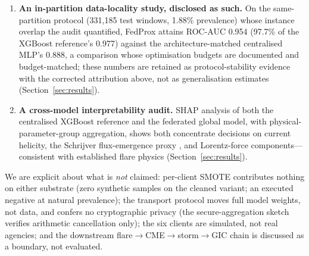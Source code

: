 \begin{enumerate}[leftmargin=2em, itemsep=3pt]
  the contribution here is the composite failure-mode dissection on
  this pipeline and the self-correction of our own earlier artefact.
  The shipped implementation transports
  model parameters only, so BatchNorm running statistics remain at
  initialisation on the server for the entire run; under that
  evaluation the FedAvg global model drifts from 0.950 to 0.098 test
  ROC-AUC over 50 rounds, and a saturated validation monitor ($F_1
  = 2p/(1{+}p)$ whenever every prediction is positive) restores the
  collapsed round-20 checkpoint as the ``best'' model. The same
  weights score 0.951 under correct normalisation and 0.953 even at
  round 50; with BatchNorm layers removed, both FedAvg and FedProx
  train stably to near-identical test quality, so the published
  algorithm gap is substantially an evaluation-implementation
  artefact (Sections~\ref{sec:res-bn}--\ref{sec:res-nobn}).
  \item \textbf{An in-partition data-locality study, disclosed as
  such.} On the same-partition protocol (331{,}185 test windows,
  1.88\% prevalence) whose instance overlap the audit quantified,
  FedProx attains ROC-AUC 0.954 (97.7\% of the XGBoost reference's
  0.977) against the architecture-matched centralised MLP's 0.888, a
  comparison whose optimisation budgets are documented and
  budget-matched; these numbers are retained as protocol-stability
  evidence with the corrected attribution above, not as
  generalisation estimates (Section~\ref{sec:results}).
  \item \textbf{A cross-model interpretability audit.} SHAP analysis
  of both the centralised XGBoost reference and the federated global
  model, with physical-parameter-group aggregation, shows both
  concentrate decisions on current helicity, the Schrijver
  flux-emergence proxy \cite{schrijver2007}, and Lorentz-force
  components---consistent with established flare physics
  (Section~\ref{sec:results}).
\end{enumerate}

We are explicit about what is \emph{not} claimed: per-client SMOTE
contributes nothing on either substrate (zero synthetic samples on
the cleaned variant; an executed negative at natural prevalence); the
transport protocol moves full model weights, not data, and confers no
cryptographic privacy (the secure-aggregation sketch verifies
arithmetic cancellation only); the six clients are simulated, not real
agencies; and the downstream flare$\to$CME$\to$storm$\to$GIC chain
is discussed as a boundary, not evaluated.

